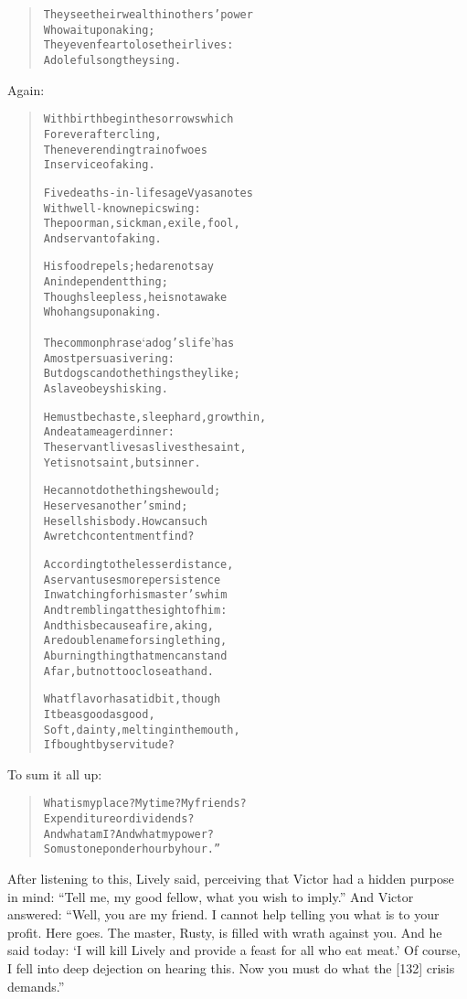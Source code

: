 \documentclass[article, twoside, 14pt]{memoir}
\renewenvironment{verbatim}{%
\begin{quote}%
\vskip -10pt%
\begin{alltt}\normalfont\large}{\end{alltt}%
\end{quote}%
\vskip -10pt
} %
\begin{document}
\begin{verbatim}
They see their wealth in others' power
    Who wait upon a king;
They even fear to lose their lives:
    A doleful song they sing.
\end{verbatim}
Again:

\begin{verbatim}
With birth begin the sorrows which
    Forever after cling,
The never ending train of woes
    In service of a king.

Five deaths-in-life sage Vyasa notes
    With well-known epic swing:
The poor man, sick man, exile, fool,
    And servant of a king.

His food repels; he dare not say
    An independent thing;
Though sleepless, he is not awake
    Who hangs upon a king.

The common phrase ‘a dog's life’ has
    A most persuasive ring:
But dogs can do the things they like;
    A slave obeys his king.

He must be chaste, sleep hard, grow thin,
    And eat a meager dinner:
The servant lives as lives the saint,
    Yet is not saint, but sinner.

He cannot do the things he would;
    He serves another's mind;
He sells his body. How can such
    A wretch contentment find?

According to the lesser distance,
A servant uses more persistence
In watching for his master's whim
And trembling at the sight of him:
And this because a fire, a king,
Are double name for single thing,
A burning thing that men can stand
Afar, but not too close at hand.

What flavor has a tidbit, though
    It be as good as good,
Soft, dainty, melting in the mouth,
    If bought by servitude?
\end{verbatim}
To sum it all up:

\begin{verbatim}
What is my place? My time? My friends?
Expenditure or dividends?
And what am I? And what my power?
So must one ponder hour by hour.”
\end{verbatim}
After listening to this, Lively said, perceiving that Victor had a
hidden purpose in mind:
``Tell me, my good fellow, what you wish to imply.'' And Victor
answered:
``Well, you are my friend. I cannot help telling you what is to your profit. Here goes. The master, Rusty, is filled with wrath against you. And he said today: `I will kill Lively and provide a feast for all who eat meat.' Of course, I fell into deep dejection on hearing this. Now you must do what the [132] crisis demands.''
\end{document}
